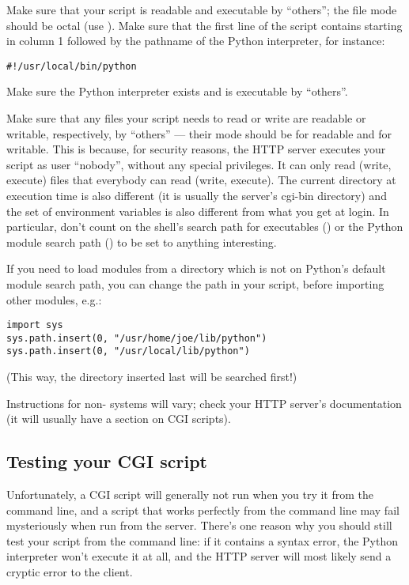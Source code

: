 Make sure that your script is readable and executable by ``others''; the
\UNIX{} file mode should be  octal (use ).  Make sure that the first line of the script contains
\code{\#!} starting in column 1 followed by the pathname of the Python
interpreter, for instance:

\begin{verbatim}
#!/usr/local/bin/python
\end{verbatim}

Make sure the Python interpreter exists and is executable by ``others''.

Make sure that any files your script needs to read or write are
readable or writable, respectively, by ``others'' --- their mode
should be  for readable and  for writable.  This
is because, for security reasons, the HTTP server executes your script
as user ``nobody'', without any special privileges.  It can only read
(write, execute) files that everybody can read (write, execute).  The
current directory at execution time is also different (it is usually
the server's cgi-bin directory) and the set of environment variables
is also different from what you get at login.  In particular, don't
count on the shell's search path for executables () or
the Python module search path () to be set to
anything interesting.

If you need to load modules from a directory which is not on Python's
default module search path, you can change the path in your script,
before importing other modules, e.g.:

\begin{verbatim}
import sys
sys.path.insert(0, "/usr/home/joe/lib/python")
sys.path.insert(0, "/usr/local/lib/python")
\end{verbatim}

(This way, the directory inserted last will be searched first!)

Instructions for non-\UNIX{} systems will vary; check your HTTP server's
documentation (it will usually have a section on CGI scripts).


\subsection{Testing your CGI script}

Unfortunately, a CGI script will generally not run when you try it
from the command line, and a script that works perfectly from the
command line may fail mysteriously when run from the server.  There's
one reason why you should still test your script from the command
line: if it contains a syntax error, the Python interpreter won't
execute it at all, and the HTTP server will most likely send a cryptic
error to the client.

